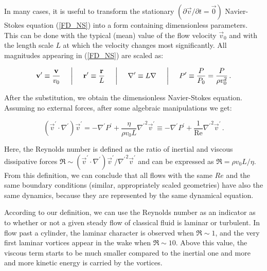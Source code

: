 In many cases, it is useful to transform the stationary $ (\partial \vec{v}/\partial t = \vec{0}) $ Navier-Stokes equation (\ref{FD_NS}) into a form containing dimensionless parameters. This can be done with the typical (mean) value of the flow velocity $\vec{v}_0$ and with the length scale $L$ at which the velocity changes most significantly. All magnitudes appearing in (\ref{FD_NS}) are scaled as:

$$
\vec{v^{\prime}} \equiv \frac{\vec{v}}{v_0} 
\hspace{5mm} \bigg\vert \hspace{5mm}
\vec{r}^{\prime} \equiv \frac{\vec{r}}{L}
\hspace{5mm} \bigg\vert \hspace{5mm}
\nabla^{\prime}  \equiv L\nabla
\hspace{5mm} \bigg\vert \hspace{5mm}
P^{\prime}       \equiv \frac{P}{P_0} = \frac{P}{\rho v_0^2}\,.
$$

After the substitution, we obtain the dimensionless Navier-Stokes equation. Assuming no external forces, after some algebraic manipulations we get:

\begin{equation}
(\vec{v}^{\prime}\cdot \nabla^{\prime})\vec{v}^{\prime}
= -\nabla^{\prime} P^{\prime}
+ \frac{\eta}{\rho v_0 L} {\nabla^{\prime}}^2 \vec{v}^{\prime}
\equiv -\nabla^{\prime} P^{\prime}
+ \frac{1}{\text{Re}} {\nabla^{\prime}}^2 \vec{v}^{\prime}\,.
\label{reynolds}
\end{equation}

Here, the Reynolds number is defined as the ratio of inertial and viscous dissipative forces  $\Re \sim (\vec{v}^{\prime}\cdot \nabla^{\prime})\vec{v}^{\prime} / {\nabla^{\prime}}^2 \vec{v}^{\prime}$ and can be expressed as $\Re = \rho v_0 L / \eta$. From this definition, we can conclude that all flows with the same $\unit{Re}$ and the same boundary conditions (similar, appropriately scaled geometries) have also the same dynamics, because they are represented by the same dynamical equation.

According to our definition, we can use the Reynolds number as an indicator as to whether or not a given steady flow of classical fluid is laminar or turbulent. In flow past a cylinder, the laminar character is observed when $\Re\sim 1$, and the very first laminar vortices appear in the wake when $\Re\sim 10$. Above this value, the viscous term starts to be much smaller compared to the inertial one and more and more kinetic energy is carried by the vortices.

